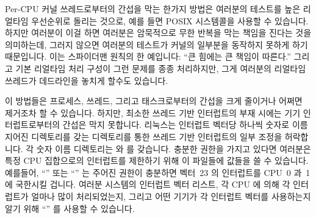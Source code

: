 \fi

Per-CPU 커널 쓰레드로부터의 간섭을 막는 한가지 방법은 여러분의 테스트를 높은
리얼타임 우선순위로 돌리는 것으로, 예를 들면 POSIX 
시스템콜을 사용할 수 있습니다.
하지만 여러분이 이걸 하면 여러분은 암묵적으로 무한 반복을 막는 책임을 진다는
것을 의미하는데, 그러지 않으면 여러분의 테스트가 커널의 일부분을 동작하지
못하게 하기 때문입니다.
이는 스파이더맨 원칙의 한 예입니다: ``큰 힘에는 큰 책임이 따른다.''
그리고 기본 리얼타임 처리 구성이 그런 문제를 종종 처리하지만, 그게 여러분의
리얼타임 쓰레드가 데드라인을 놓치게 할수도 있습니다.

이 방법들은 프로세스, 쓰레드, 그리고 태스크로부터의 간섭을 크게 줄이거나 어쩌면
제거조차 할 수 있습니다.
하지만, 최소한 쓰레드 기반 인터럽트의 부재 시에는 기기 인터럽트로부터의 간섭은
막지 못합니다.
리눅스는 인터럽트 벡터당 하나씩 숫자로 이름지어진 디렉토리를 갖는
 디렉토리를 통한 쓰레드 기반 인터럽트의 일부 조정을 허락합니다.
각 숫자 이름 디렉토리는  와  를
갖습니다.
충분한 권한을 가지고 있다면 여러분은 특정 CPU 집합으로의 인터럽트를 제한하기
위해 이 파일들에 값들을 쓸 수 있습니다.
예를들어,
``''
또는
``''
는 주어진 권한이 충분하면 벡터~23 의 인터럽트를 CPU~0 과~1 에 국한시킬 겁니다.
여러분 시스템의 인터럽트 벡터 리스트, 각 CPU 에 의해 각 인터럽트가 얼마나 많이
처리되었는지, 그리고 어떤 기기가 각 인터럽트 벡터를 사용하는지 알기 위해
``'' 를 사용할 수 있습니다.

\iffalse

